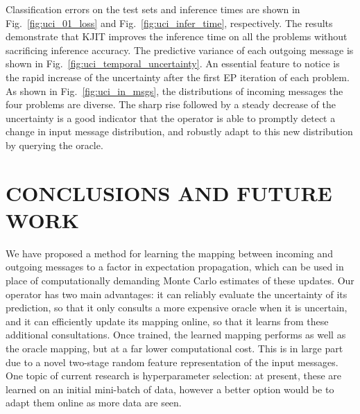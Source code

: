 \documentclass[english]{article}
\theoremstyle{plain}
\theoremstyle{plain}
\newcommand{\figref}[1]{Fig.~\ref{#1}}
\begin{document}
Classification errors on the test sets and inference times are shown in 
\figref{fig:uci_01_loss} and \figref{fig:uci_infer_time}, respectively.
The results demonstrate that KJIT improves the inference time on all the 
problems without sacrificing inference accuracy. The  predictive 
variance of each outgoing message is shown in 
\figref{fig:uci_temporal_uncertainty}. An essential feature to notice is the 
rapid increase of the uncertainty after the first EP iteration of each problem. 
As shown in \figref{fig:uci_in_msgs}, the distributions of incoming messages 
 the four problems are diverse. 
The sharp rise followed by a steady decrease of the uncertainty is a good indicator 
that the operator is able to promptly detect a change in input message distribution,
and robustly adapt to this new distribution by querying the oracle.








\section{CONCLUSIONS AND FUTURE WORK}
\label{sec:Conclusions-and-Future} 

We have proposed a method for learning the mapping between incoming and outgoing
messages to a factor in expectation propagation, which can be used
in place of computationally demanding Monte Carlo estimates of these updates.
Our operator has two main advantages: it can reliably evaluate the uncertainty of its prediction,
so that it only consults a more expensive oracle when it is uncertain,
and it can efficiently update its mapping online, so that it learns
from these additional consultations. Once trained, the learned mapping
performs as well as the oracle mapping, but at a far lower computational cost.
This is in large part due to a novel two-stage random feature representation of the input
messages. One topic of current research is hyperparameter selection:
at present, these are learned on an initial mini-batch of data, however
a better option would be to adapt them online as more data are seen.
\end{document}
